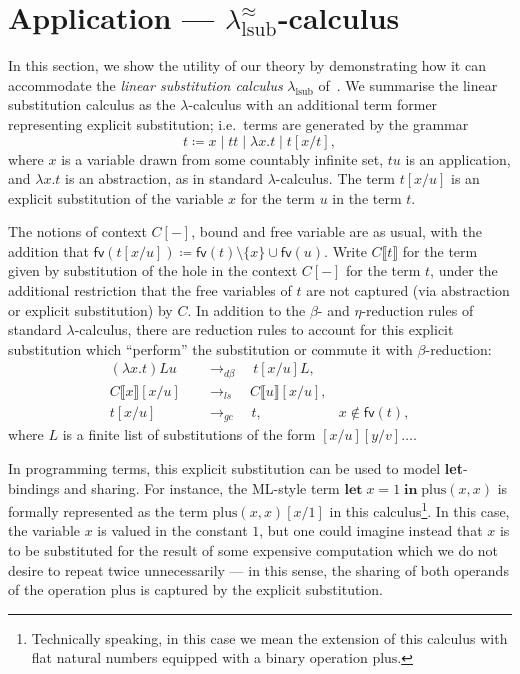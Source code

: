 \section{Application --- \texorpdfstring{$\lambda^\approx_{\text{lsub}}$-}{linear substitution }calculus}
\label{sec:application}

In this section, we show the utility of our theory by demonstrating how it can accommodate the \emph{linear substitution calculus} $\lambda_{\text{lsub}}$ of~\citet[§ 2]{accattoli2014nonstandard}.
We summarise the linear substitution calculus as the $\lambda$-calculus with an additional term former representing explicit substitution; i.e.\ terms are generated by the grammar
\[
	t \coloneqq x \mid t t \mid \lambda x. t \mid t [x/t],
\]
where $x$ is a variable drawn from some countably infinite set, $t u$ is an application, and $\lambda x. t$ is an abstraction, as in standard $\lambda$-calculus.
The term $t [x / u]$ is an explicit substitution of the variable $x$ for the term $u$ in the term $t$.

The notions of context $C[-]$, bound and free variable are as usual, with the addition that $\textsf{fv} (t [x/u]) \coloneq \textsf{fv} (t) \setminus \{ x \} \cup \textsf{fv} (u)$.
Write $C \llbracket t \rrbracket$ for the term given by substitution of the hole in the context $C[-]$ for the term $t$, under the additional restriction that the free variables of $t$ are not captured (via abstraction or explicit substitution) by $C$.
In addition to the $\beta$- and $\eta$-reduction rules of standard $\lambda$-calculus, there are reduction rules to account for this explicit substitution which \enquote{perform} the substitution or commute it with $\beta$-reduction:
\begin{align*}
	(\lambda x. t) L u              \quad & \to_{d\beta} \quad t[x/u] L,                                                \\
	C \llbracket x \rrbracket [x/u] \quad & \to_{ls} \quad C \llbracket u \rrbracket [x/u],                             \\
	t [x/u]                         \quad & \to_{gc} \quad t,                               & x \notin \textsf{fv} (t),
\end{align*}
where $L$ is a finite list of substitutions of the form $[x/u] [y/v] \ldots$.

In programming terms, this explicit substitution can be used to model \textbf{let}-bindings and sharing.
For instance, the ML-style term $\textbf{let} \; x = 1 \; \textbf{in} \; \text{plus} (x, x)$ is formally represented as the term $\text{plus} (x, x) [x / 1]$ in this calculus\footnote{Technically speaking, in this case we mean the extension of this calculus with flat natural numbers equipped with a binary operation $\text{plus}$.}.
In this case, the variable $x$ is valued in the constant $1$, but one could imagine instead that $x$ is to be substituted for the result of some expensive computation which we do not desire to repeat twice unnecessarily --- in this sense, the sharing of both operands of the operation $\text{plus}$ is captured by the explicit substitution.

